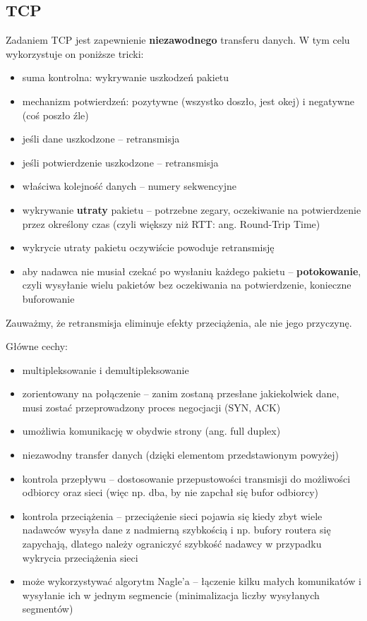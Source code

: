 \subsection{TCP}
Zadaniem TCP jest zapewnienie \textbf{niezawodnego} transferu danych. W tym celu wykorzystuje on poniższe tricki:
\begin{itemize}
    \item suma kontrolna: wykrywanie uszkodzeń pakietu
    \item mechanizm potwierdzeń: pozytywne (wszystko doszło, jest okej) i negatywne (coś poszło źle)
    \item jeśli dane uszkodzone -- retransmisja
    \item jeśli potwierdzenie uszkodzone -- retransmisja
    \item właściwa kolejność danych -- numery sekwencyjne
    \item wykrywanie \textbf{utraty} pakietu -- potrzebne zegary, oczekiwanie na potwierdzenie przez określony czas (czyli większy niż RTT: ang. Round-Trip Time)
    \item wykrycie utraty pakietu oczywiście powoduje retransmisję
    \item aby nadawca nie musiał czekać po wysłaniu każdego pakietu -- \textbf{potokowanie}, czyli wysyłanie wielu pakietów bez oczekiwania na potwierdzenie, konieczne buforowanie
\end{itemize}
Zauważmy, że retransmisja eliminuje efekty przeciążenia, ale nie jego przyczynę.

Główne cechy:
\begin{itemize}
    \item multipleksowanie i demultipleksowanie
    \item zorientowany na połączenie -- zanim zostaną przesłane jakiekolwiek dane, musi zostać przeprowadzony proces negocjacji (SYN, ACK)
    \item umożliwia komunikację w obydwie strony (ang. full duplex)
    \item niezawodny transfer danych (dzięki elementom przedstawionym powyżej)
    \item kontrola przepływu -- dostosowanie przepustowości transmisji do możliwości odbiorcy oraz sieci (więc np. dba, by nie zapchał się bufor odbiorcy)
    \item kontrola przeciążenia -- przeciążenie sieci pojawia się kiedy zbyt wiele nadawców wysyła dane z nadmierną szybkością i np. bufory routera się zapychają, dlatego należy ograniczyć szybkość nadawcy w przypadku wykrycia przeciążenia sieci
    \item może wykorzystywać algorytm Nagle'a -- łączenie kilku małych komunikatów i wysyłanie ich w jednym segmencie (minimalizacja liczby wysyłanych segmentów)
\end{itemize}

